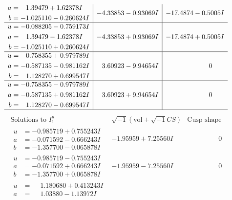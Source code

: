 \documentclass[1p]{elsarticle_modified}
\theoremstyle{definition}
\newcommand{\I}{\sqrt{-1}}
\begin{document}
$$\begin{array}{c|c|c}
\begin{aligned}
a &= \phantom{-}1.39479 + 1.62378 I \\
b &= -1.025110 - 0.260624 I\end{aligned}
 & -4.33853 - 0.93069 I & -17.4874 - 0.5005 I \\ \hline\begin{aligned}
u &= -0.088205 - 0.759173 I \\
a &= \phantom{-}1.39479 - 1.62378 I \\
b &= -1.025110 + 0.260624 I\end{aligned}
 & -4.33853 + 0.93069 I & -17.4874 + 0.5005 I \\ \hline\begin{aligned}
u &= -0.758355 + 0.979789 I \\
a &= -0.587135 - 0.981162 I \\
b &= \phantom{-}1.128270 + 0.699547 I\end{aligned}
 & \phantom{-}3.60923 - 9.94654 I & \phantom{-0.000000 } 0 \\ \hline\begin{aligned}
u &= -0.758355 - 0.979789 I \\
a &= -0.587135 + 0.981162 I \\
b &= \phantom{-}1.128270 - 0.699547 I\end{aligned}
 & \phantom{-}3.60923 + 9.94654 I & \phantom{-0.000000 } 0\\
 \hline 
 \end{array}$$\newpage$$\begin{array}{c|c|c}  
\text{Solutions to }I^u_{1}& \I (\text{vol} + \sqrt{-1}CS) & \text{Cusp shape}\\
 \hline 
\begin{aligned}
u &= -0.985719 + 0.755243 I \\
a &= -0.071592 - 0.666243 I \\
b &= -1.357700 - 0.065878 I\end{aligned}
 & -1.95959 + 7.25560 I & \phantom{-0.000000 } 0 \\ \hline\begin{aligned}
u &= -0.985719 - 0.755243 I \\
a &= -0.071592 + 0.666243 I \\
b &= -1.357700 + 0.065878 I\end{aligned}
 & -1.95959 - 7.25560 I & \phantom{-0.000000 } 0 \\ \hline\begin{aligned}
u &= \phantom{-}1.180680 + 0.413243 I \\
a &= \phantom{-}1.03880 - 1.13972 I \\

\end{aligned}
\end{array}$$
\end{document}
